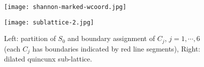 \begin{figure}[!t]
\centering
\begin{minipage}[c]{.42\textwidth}
\texttt{[image: shannon-marked-wcoord.jpg]}
\end{minipage}\hspace*{3em}
\begin{minipage}[c]{.3\textwidth}
\texttt{[image: sublattice-2.jpg]}
\vspace*{1em}
\end{minipage}
\caption{Left: partition of $S_0$ and boundary assignment of $C_j$, $j = 1,\cdots,6$ (each $C_j$ has boundaries indicated by red line segments), Right: dilated quincunx sub-lattice. }
\label{fig: partition}
\vspace*{-5mm}
\end{figure}



